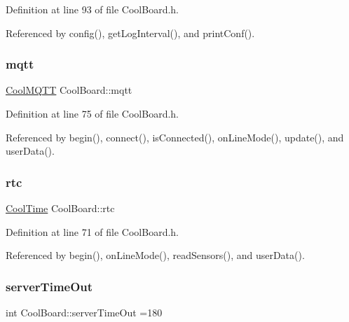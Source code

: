 Definition at line 93 of file Cool\+Board.\+h.



Referenced by config(), get\+Log\+Interval(), and print\+Conf().

\mbox{\label{classCoolBoard_a2399f44d7c23c1149a335cb3b46d90f1}} 
\subsubsection{\texorpdfstring{mqtt}{mqtt}}
{\footnotesize\ttfamily \hyperlink{classCoolMQTT}{Cool\+M\+Q\+TT} Cool\+Board\+::mqtt\hspace{0.3cm}{\ttfamily [private]}}



Definition at line 75 of file Cool\+Board.\+h.



Referenced by begin(), connect(), is\+Connected(), on\+Line\+Mode(), update(), and user\+Data().

\mbox{\label{classCoolBoard_a50d2a6716879d64a85f3c6b44ad63275}} 
\subsubsection{\texorpdfstring{rtc}{rtc}}
{\footnotesize\ttfamily \hyperlink{classCoolTime}{Cool\+Time} Cool\+Board\+::rtc\hspace{0.3cm}{\ttfamily [private]}}



Definition at line 71 of file Cool\+Board.\+h.



Referenced by begin(), on\+Line\+Mode(), read\+Sensors(), and user\+Data().

\mbox{\label{classCoolBoard_a7a8d8d3d316220cdd049cd63c1aa8fe6}} 
\subsubsection{\texorpdfstring{server\+Time\+Out}{serverTimeOut}}
{\footnotesize\ttfamily int Cool\+Board\+::server\+Time\+Out =180\hspace{0.3cm}{\ttfamily [private]}}



